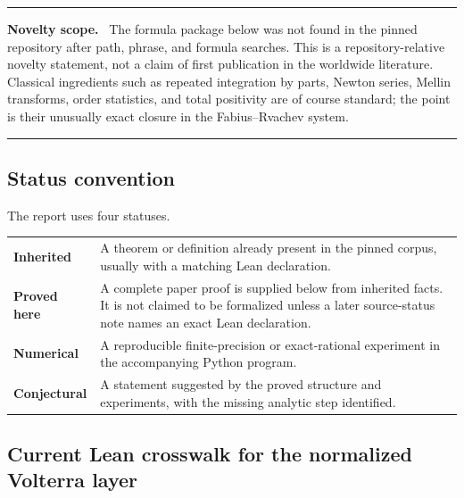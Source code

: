 \documentclass[11pt,oneside]{article}
\numberwithin{equation}{section}
\theoremstyle{definition}
\theoremstyle{remark}
\newenvironment{warningbox}[1]{%
  \par\medskip\noindent\begin{center}\begin{minipage}{0.94\textwidth}%
  \color{deepred}\hrule\vspace{0.62em}%
  \color{black}\textbf{\color{deepred}#1.}\ }{%
  \par\vspace{0.62em}\color{deepred}\hrule
  \end{minipage}\end{center}\medskip}
\begin{document}
\begin{warningbox}{Novelty scope}
The formula package below was not found in the pinned repository after path, phrase, and
formula searches.  This is a repository-relative novelty statement, not a claim of first
publication in the worldwide literature.  Classical ingredients such as repeated integration
by parts, Newton series, Mellin transforms, order statistics, and total positivity are of
course standard; the point is their unusually exact closure in the Fabius--Rvachev system.
\end{warningbox}

\subsection{Status convention}

The report uses four statuses.

\begin{center}
\begin{tabularx}{0.94\textwidth}{@{}>{\bfseries}lX@{}}
\toprule
Inherited & A theorem or definition already present in the pinned corpus, usually with a
matching Lean declaration.\\
Proved here & A complete paper proof is supplied below from inherited facts.  It is not
claimed to be formalized unless a later source-status note names an exact Lean declaration.\\
Numerical & A reproducible finite-precision or exact-rational experiment in the accompanying
Python program.\\
Conjectural & A statement suggested by the proved structure and experiments, with the missing
analytic step identified.\\
\bottomrule
\end{tabularx}
\end{center}

\subsection{Current Lean crosswalk for the normalized Volterra layer}
\end{document}
